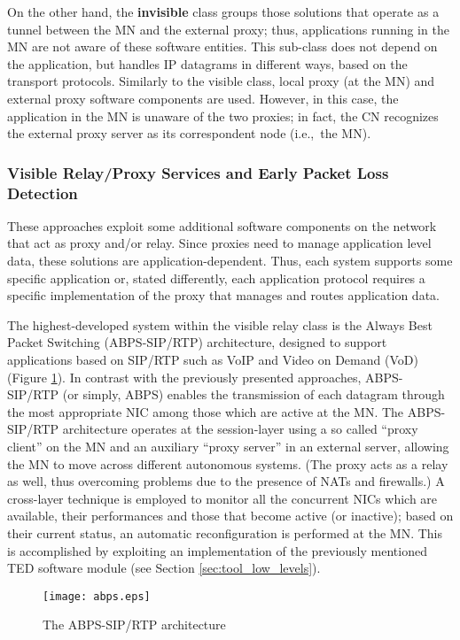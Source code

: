 \documentclass[preprint,12pt]{elsarticle}
\begin{document}
On the other hand, the \textbf{invisible} class groups those solutions that operate as a tunnel between the MN and the external proxy; thus, applications running in the MN are not aware of these software entities. 
This sub-class does not depend on the application, but handles IP datagrams in different ways, based on the transport protocols. 
Similarly to the visible class, local proxy (at the MN) and external proxy software components are used. However, in this case, the application in the MN is unaware of the two proxies; in fact, the CN recognizes the external proxy server as its correspondent node
(i.e.,~the MN). 

\subsubsection{Visible Relay/Proxy Services and Early Packet Loss Detection}
These approaches exploit some additional software components on the network 
that act as proxy and/or relay. Since proxies need to manage application level 
data, these solutions are application-dependent. Thus, each system supports some 
specific application or, stated differently, each application protocol requires 
a specific implementation of the proxy that manages and routes application data.

The highest-developed system within the visible relay class is the Always Best Packet Switching (ABPS-SIP/RTP) architecture, designed to support applications based on SIP/RTP such as VoIP and Video on Demand (VoD) \cite{GhiniJSS} (Figure \ref{fig:abps}). 
In contrast with the previously presented approaches, ABPS-SIP/RTP (or simply, ABPS) enables the transmission of each datagram through the most appropriate NIC among those which are active at the MN. 
The ABPS-SIP/RTP architecture operates at the session-layer using a so called ``proxy client'' on the MN and an auxiliary ``proxy server'' in an external server, allowing the MN to move across different autonomous systems. 
(The proxy acts as a relay as well, thus overcoming problems due to the presence of NATs and firewalls.)
A cross-layer technique is employed to monitor all the concurrent NICs 
which are available, their performances and those that become active (or inactive); 
based on their current status, an automatic reconfiguration is performed at the 
MN. This is accomplished by exploiting an implementation of the previously 
mentioned TED software module (see Section \ref{sec:tool_low_levels}).

\begin{figure}[h]
   \centering
   \texttt{[image: abps.eps]}
   \caption{The ABPS-SIP/RTP architecture}
   \label{fig:abps}
\end{figure}
\end{document}
